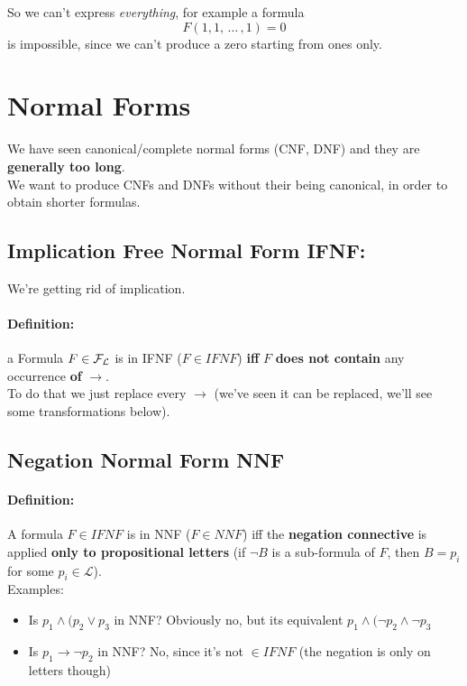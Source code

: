	So we can't express \textit{everything}, for example a formula
	$$ F(1,1, \, \dots \, , 1) = 0 $$
	is impossible, since we can't produce a zero starting from ones only.\\

	\newpage

	\section{Normal Forms}

	We have seen canonical/complete normal forms (CNF, DNF) and they are \textbf{generally too long}.\\
	We want to produce CNFs and DNFs without their being canonical, in order to obtain shorter formulas.\\

	\subsection{Implication Free Normal Form IFNF:}

	We're getting rid of implication.\\

	\paragraph{Definition:} a Formula $F \in \mathcal{F}_\mathcal{L}$ is in IFNF ($F \in IFNF$) \textbf{iff} $F$ \textbf{does not contain} any occurrence \textbf{of} $\rightarrow$.\\

	To do that we just replace every $\rightarrow$ (we've seen it can be replaced, we'll see some transformations below).\\

	\subsection{Negation Normal Form NNF}

	\paragraph{Definition:} A formula $F \in IFNF$ is in NNF ($F \in NNF$) iff the \textbf{negation connective} is applied \textbf{only to propositional letters} (if $\neg B$ is a sub-formula of $F$, then $B = p_i$ for some $p_i \in \mathcal{L}$).\\

	Examples:
	\begin{itemize}
		\item Is $p_1 \wedge (p_2 \vee p_3$ in NNF?
		Obviously no, but its equivalent $p_1 \wedge (\neg p_2 \wedge \neg p_3$
		\item Is $p_1 \rightarrow \neg p_2$ in NNF? No, since it's not $\in IFNF$ (the negation is only on letters though)
	\end{itemize}


